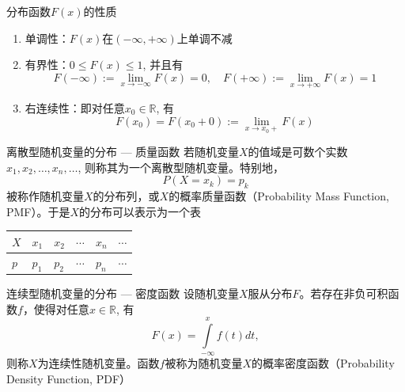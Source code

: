 
\begin{frame}

\begin{block}{分布函数$F(x)$的性质}
\begin{enumerate}
\item 单调性：$F(x)$在$(-\infty, +\infty)$上单调不减
\item 有界性：$0 \le F(x) \le 1$, 并且有
$$F(-\infty) := \lim\limits_{x\to-\infty} F(x) = 0, \quad F(+\infty) := \lim\limits_{x\to+\infty} F(x) = 1$$
\item 右连续性：即对任意$x_0\in\mathbb{R}$, 有
$$F(x_0) = F(x_0+0) := \lim\limits_{x\to x_0+} F(x)$$
\end{enumerate}
\end{block}

\end{frame}


\begin{frame}

\begin{block}{离散型随机变量的分布 --- 质量函数}
若随机变量$X$的值域是可数个实数$x_1,x_2, \ldots, x_n, \ldots$, 则称其为一个离散型随机变量。特别地，
$$P(X = x_k) = p_k$$
被称作随机变量$X$的分布列，或$X$的概率质量函数（Probability Mass Function, PMF）。于是$X$的分布可以表示为一个表
\begin{center}
\renewcommand{\arraystretch}{1.5}
\begin{tabu} to 0.8\textwidth { X[c] | X[c] | X[c] | X[c] | X[c] | X[c] }
\hline
$X$ & $x_1$ & $x_2$ & $\cdots$ & $x_n$ & $\cdots$ \\
\hline
$p$ & $p_1$ & $p_2$ & $\cdots$ & $p_n$ & $\cdots$ \\
\hline
\end{tabu}
\renewcommand{\arraystretch}{1}
\end{center}
\end{block}

\end{frame}


\begin{frame}

\begin{block}{连续型随机变量的分布 --- 密度函数}
设随机变量$X$服从分布$F$。若存在非负可积函数$f$，使得对任意$x\in\mathbb{R}$, 有
$$F(x) = \int\limits_{-\infty}^x f(t)dt,$$
则称$X$为连续性随机变量。函数$f$被称为随机变量$X$的概率密度函数（Probability Density Function, PDF）
\end{block}

\end{frame}

